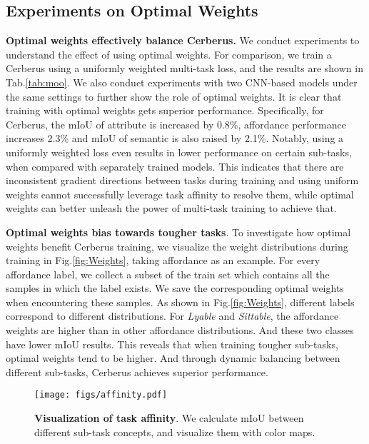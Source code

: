 \documentclass[10pt,twocolumn,letterpaper]{article}
\begin{document}
\subsection{Experiments on Optimal Weights} 

\textbf{Optimal weights effectively balance Cerberus.} We conduct experiments to understand the effect of using optimal weights. For comparison, we train a Cerberus using a uniformly weighted multi-task loss, and the results are shown in Tab.\ref{tab:moo}. We also conduct experiments with two CNN-based models under the same settings to further show the role of optimal weights. It is clear that training with optimal weights gets superior performance. Specifically, for Cerberus, the mIoU of attribute is increased by 0.8\%, affordance performance increases 2.3\% and mIoU of semantic is also raised by 2.1\%. Notably, using a uniformly weighted loss even results in lower performance on certain sub-tasks, when compared with separately trained models. This indicates that there are inconsistent gradient directions between tasks during training and using uniform weights cannot successfully leverage task affinity to resolve them, while optimal weights can better unleash the power of multi-task training to achieve that.


\textbf{Optimal weights bias towards tougher tasks}. To investigate how optimal weights benefit Cerberus training, we visualize the weight distributions during training in Fig.\ref{fig:Weights}, taking affordance as an example. For every affordance label, we collect a subset of the train set which contains all the samples in which the label exists. We save the corresponding optimal weights when encountering these samples. As shown in Fig.\ref{fig:Weights}, different labels correspond to different distributions. For \emph{Lyable} and \emph{Sittable}, the affordance weights are higher than in other affordance distributions. And these two classes have lower mIoU results. This reveals that when training tougher sub-tasks, optimal weights tend to be higher. And through dynamic balancing between different sub-tasks, Cerberus achieves superior performance. 

\begin{figure*}[htbp]
  \centering
  \texttt{[image: figs/affinity.pdf]}
  \caption{\textbf{Visualization of task affinity}. We calculate mIoU between different sub-task concepts, and visualize them with color maps.}
  \label{fig:task} 
\end{figure*}
\end{document}

